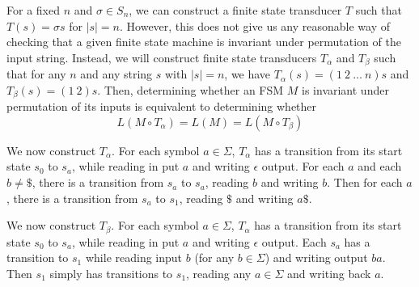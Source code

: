 \documentclass{llncs}
\begin{document}
For a fixed $n$ and $\sigma \in S_n$,
we can construct a finite state transducer
$T$ such that $T(s) = \sigma s$ for $|s|=n$.
However, this does not give us any
reasonable way of checking that a given
finite state machine is invariant under permutation
of the input string.
Instead, we will construct finite state
transducers $T_{\alpha}$ and $T_{\beta}$
such that for any $n$ and any string $s$ 
with $|s|=n$, we have 
$T_{\alpha}(s)=(1\ 2\ \ldots\ n) s$ and
$T_{\beta}(s) = (1\ 2) s$.
Then, determining whether an FSM $M$ is
invariant under permutation of its inputs
is equivalent to determining whether
\[ 
  L(M \circ T_\alpha) = L(M) = L(M \circ T_\beta)
\]

We now construct $T_\alpha$.
For each symbol $a \in \Sigma$,
$T_\alpha$ has a transition from its start
state $s_0$ to $s_a$, while reading in put $a$ and 
writing $\epsilon$ output.
For each $a$ and each $b\ne \$$, there is a
transition from $s_a$ to $s_a$, reading $b$
and writing $b$.
Then for each $a$, there is a transition from 
$s_a$ to $s_1$, reading $\$$ and writing $a\$$.

We now construct $T_\beta$.
For each symbol $a \in \Sigma$,
$T_\alpha$ has a transition from its start
state $s_0$ to $s_a$, while reading in put $a$ and 
writing $\epsilon$ output.
Each $s_a$ has a transition to $s_1$ while
reading input $b$ (for any $b\in \Sigma$)
and writing output $ba$.
Then $s_1$ simply has transitions to $s_1$,
reading any $a\in \Sigma$ and writing
back $a$.

\iffalse %
\subsection{Programs}
The previous section indicates a method for verifying
robustness of more general programs under permutation of inputs. 
Given a procedure $F$ taking an array as argument, consider the functions $F_\alpha$, which first swaps the first two elements of the array, then computes $F$, and $F_\beta$, which moves the first element of the array to the back, then computes $F$. Then $F$ is invariant under permutation of its input if and only if $F$ is functionally equivalent to $F_\alpha$ and $F_\beta$.

Certainly this method is more efficient than checking invariance under a larger class of permutations. For DFAs, this simplification made the problem of permutation invariance solvable. This indicates that this simplification may aid in our analysis in a profound way. For example, this may be a much easier way of verifying this invariance compared to expressing permutations as a general $2$-safety property.
\fi
\end{document}
